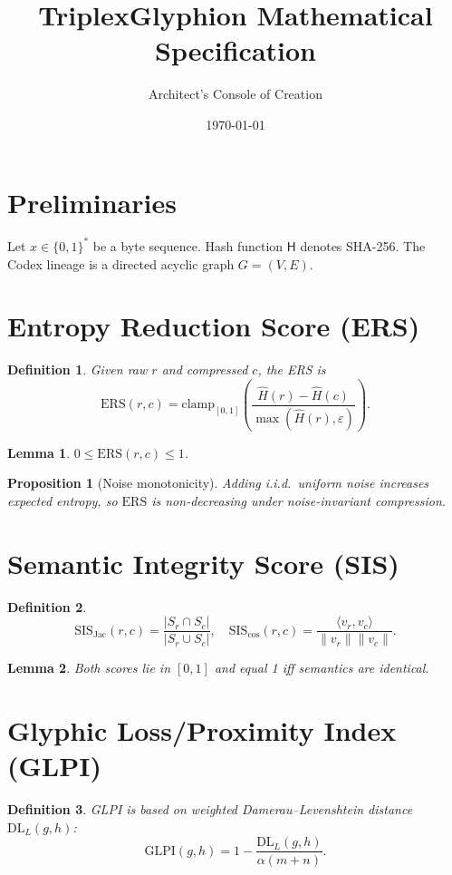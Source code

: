 \documentclass[12pt]{article}
\title{TriplexGlyphion Mathematical Specification}
\author{Architect's Console of Creation}
\date{\today}
\newtheorem{lemma}{Lemma}
\newtheorem{proposition}{Proposition}
\newtheorem{definition}{Definition}
\begin{document}
\maketitle

\section{Preliminaries}
Let $x \in \{0,1\}^*$ be a byte sequence. Hash function $\mathsf{H}$ denotes SHA-256. The Codex lineage is a directed acyclic graph $G=(V,E)$.

\section{Entropy Reduction Score (ERS)}
\begin{definition}
Given raw $r$ and compressed $c$, the ERS is
\[
\mathrm{ERS}(r,c)=\mathrm{clamp}_{[0,1]}\left(\frac{\hat{H}(r)-\hat{H}(c)}{\max(\hat{H}(r),\varepsilon)}\right).
\]
\end{definition}

\begin{lemma}
$0 \le \mathrm{ERS}(r,c) \le 1$.
\end{lemma}

\begin{proposition}[Noise monotonicity]
Adding i.i.d.\ uniform noise increases expected entropy, so $\mathrm{ERS}$ is non-decreasing under noise-invariant compression.
\end{proposition}

\section{Semantic Integrity Score (SIS)}
\begin{definition}
\[\mathrm{SIS}_{\mathrm{Jac}}(r,c)=\frac{|S_r \cap S_c|}{|S_r \cup S_c|}, \quad 
\mathrm{SIS}_{\cos}(r,c)=\frac{\langle v_r,v_c\rangle}{\|v_r\|\|v_c\|}.\]
\end{definition}

\begin{lemma}
Both scores lie in $[0,1]$ and equal 1 iff semantics are identical.
\end{lemma}

\section{Glyphic Loss/Proximity Index (GLPI)}
\begin{definition}
GLPI is based on weighted Damerau--Levenshtein distance $\mathrm{DL}_L(g,h)$:
\[\mathrm{GLPI}(g,h) = 1 - \frac{\mathrm{DL}_L(g,h)}{\alpha(m+n)}.\]
\end{definition}
\end{document}
